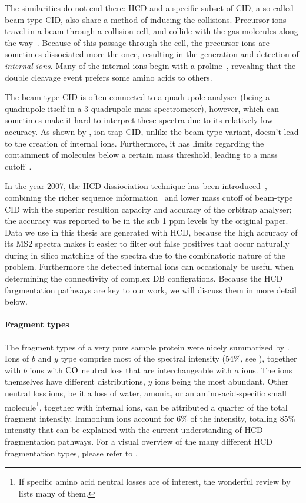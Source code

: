 The similarities do not end there: HCD and a specific subset of CID, a so called beam-type CID, also share a method of inducing the collisions. Precursor ions travel in a beam through a collision cell, and collide with the gas molecules along the way~\cite{xia2006ion}. Because of this passage through the cell, the precursor ions are sometimes dissociated more the once, resulting in the generation and detection of \emph{internal ions}. Many of the internal ions begin with a proline~\cite{michalski2012systematic}, revealing that the double cleavage event prefers some amino acids to others.

The beam-type CID is often connected to a quadrupole analyser (being a quadrupole itself in a 3-quadrupole mass spectrometer), however, which can sometimes make it hard to interpret these spectra due to its relatively low accuracy. As shown by \citet{michalski2012systematic}, ion trap CID, unlike the beam-type variant, doesn't lead to the creation of internal ions. Furthermore, it has limits regarding the containment of molecules below a certain mass threshold, leading to a mass cutoff~\cite{louris1987instrumentation}.

In the year 2007, the HCD dissiociation technique has been introduced~\cite{olsen2007higher}, combining the richer sequence information~\cite{xia2006ion} and lower mass cutoff of beam-type CID with the superior resultion capacity and accuracy of the orbitrap analyser; the accuracy was reported to be in the sub 1 ppm levels by the original paper. Data we use in this thesis are generated with HCD\@, because the high accuracy of its MS2 spectra makes it easier to filter out false positives that occur naturally during in silico matching of the spectra due to the combinatoric nature of the problem. Furthermore the detected internal ions can occasionaly be useful when determining the connectivity of complex DB configrations. Because the HCD fargmentation pathways are key to our work, we will discuss them in more detail below.

\paragraph{Fragment types} The fragment types of a very pure sample protein were nicely summarized by \citet{michalski2012systematic}. Ions of \(b\) and \(y\) type comprise most of the spectral intensity (54\%, see ), together with \(b\) ions with \(\ce{CO}\) neutral loss that are interchangeable with \(a\) ions. The ions themselves have different distributions, \(y\) ions being the most abundant. Other neutral loss ions, be it a loss of water, amonia, or an amino-acid-specific small molecule\footnote{If specific amino acid neutral losses are of interest, the wonderful review by~\cite{paizs2005fragmentation} lists many of them.}, together with internal ions, can be attributed a quarter of the total fragment intensity. Immonium ions account for 6\% of the intensity, totaling 85\% intensity that can be explained with the current understanding of HCD fragmentation pathways. For a visual overview of the many different HCD fragmentation types, please refer to .

